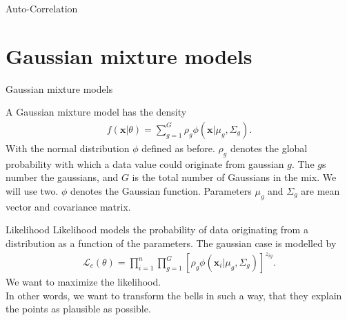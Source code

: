 \documentclass[notes]{beamer}
\begin{document}
    \begin{frame}{Auto-Correlation}
    \end{frame}

    \section{Gaussian mixture models}

    \begin{frame}{Gaussian mixture models}
    
    A Gaussian mixture model has the density \cite{mcnicholas2016mixture}
    \begin{align}
        f(\mathbf{x}| \theta)  = \sum_{g=1}^G \rho_g \phi(\mathbf{x}|\mu_g, \Sigma_g).
    \end{align}
    With the normal distribution $\phi$ defined as before. $\rho_g$ denotes the global probability with which a data value could originate from gaussian $g$. The $g$s number the gaussians, and $G$ is the total number of Gaussians in the mix. We will use two. $\phi$ denotes the Gaussian function. Parameters $\mu_g$ and $\Sigma_g$ are mean vector and covariance matrix.
    \end{frame}

    \begin{frame}{Likelihood}
      Likelihood models the probability of data originating from a distribution as a function of the 
      parameters. The gaussian case is modelled by \cite{mcnicholas2016mixture}
      \begin{align}
        \mathcal{L}_c(\theta) = \prod_{i=1}^{n}\prod_{g=1}^G [\rho_g \phi(\mathbf{x}_i|\mu_g, \Sigma_g)]^{z_{ig}}.
      \end{align}
      We want to maximize the likelihood. \\
      In other words, we want to transform the bells in such a way, that 
      they explain the points as plausible as possible.
    \end{frame}
\end{document}
